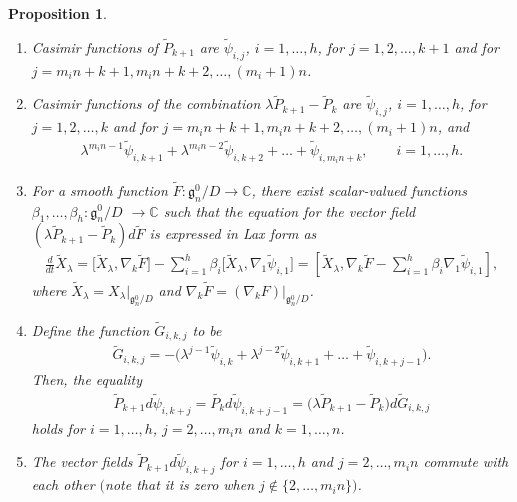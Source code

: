 \documentclass[10pt,a4paper]{amsart}
\numberwithin{equation}{section}
\newtheorem{Proposition}[Theorem]{Proposition}
 { \theoremstyle{definition}
\newtheorem{Example}[Theorem]{Example}}
\begin{document}
\begin{Proposition}\label{proposition2.6}\quad
\begin{enumerate}\itemsep=0pt
\item[$(i)$] Casimir functions of $\widetilde{P}_{k+1}$ are $\widetilde{\psi}_{i,j}$, $i=1,\dots ,h$, for
$j=1,2,\dots ,k+1$ and for $j=m_in+k+1, m_in+k+2,\dots ,(m_i+1)n$.

\item[$(ii)$] Casimir functions of the combination $\lambda \widetilde{P}_{k+1} - \widetilde{P}_k$ are $\widetilde{\psi}_{i,j}$, $i=1,\dots ,h$, for $j=1,2,\dots ,k$ and for $j=m_in+k+1, m_in+k+2,\dots ,(m_i+1)n$, and
\begin{gather*}
\lambda ^{m_in-1}\widetilde{\psi}_{i,k+1} + \lambda ^{m_in-2}\widetilde{\psi}_{i, k+2}
 + \dots + \widetilde{\psi}_{i,m_in+k}, \qquad i=1,\dots ,h.
\end{gather*}
\item[$(iii)$] For a smooth function $\widetilde{F}\colon \mathfrak{g}^0_n/D \to \mathbb{C}$, there exist scalar-valued functions $\beta_1,\dots ,\beta_h \colon \mathfrak{g}^0_n/D$ $\to \mathbb{C}$ such that the equation for the vector field $(\lambda \widetilde{P}_{k+1} - \widetilde{P}_k)d\widetilde{F}$ is expressed in Lax form as
\begin{gather*}
\frac{d}{dt}\widetilde{X}_\lambda = \big[\widetilde{X}_\lambda , \nabla _k\widetilde{F}\big]
 - \sum^h_{i=1}\beta_i \big[\widetilde{X}_\lambda , \nabla _1 \widetilde{\psi}_{i,1}\big]
 = \left[\widetilde{X}_\lambda , \nabla _k\widetilde{F}-\sum^h_{i=1}\beta_i \nabla _1 \widetilde{\psi}_{i,1}\right],
\end{gather*}
where $\widetilde{X}_\lambda = X_\lambda |_{\mathfrak{g}^0_n/D}$ and $\nabla _k\widetilde{F} = (\nabla _kF)|_{\mathfrak{g}^0_n/D}$.

\item[$(iv)$] Define the function $\widetilde{G}_{i,k,j}$ to be
\begin{gather*}
\widetilde{G}_{i,k,j} = -\big( \lambda ^{j-1}\widetilde{\psi}_{i,k} + \lambda ^{j-2} \widetilde{\psi}_{i,k+1} + \dots + \widetilde{\psi}_{i,k+j-1}\big).
\end{gather*}
Then, the equality
\begin{gather*}
\widetilde{P}_{k+1}d\widetilde{\psi}_{i,k+j} = \widetilde{P_k}d\widetilde{\psi}_{i,k+j-1}
 = \big(\lambda \widetilde{P}_{k+1}-\widetilde{P}_k\big)d\widetilde{G}_{i,k,j}
\end{gather*}
holds for $i=1,\dots ,h$, $j=2,\dots ,m_in$ and $k=1,\dots ,n$.
\item[$(v)$] The vector fields $\widetilde{P}_{k+1}d\widetilde{\psi}_{i,k+j}$ for $i=1,\dots ,h$ and $j=2,\dots , m_in$
commute with each other $($note that it is zero when $j\notin \{ 2,\dots ,m_in\})$.
\end{enumerate}
\end{Proposition}
\end{document}
